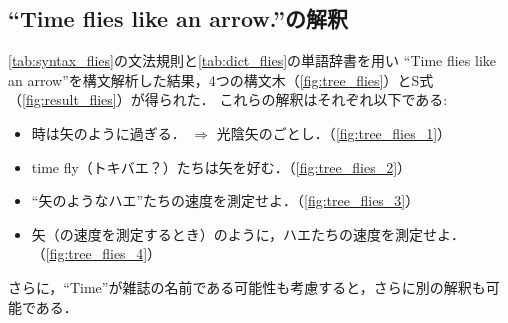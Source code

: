 \documentclass[uplatex, dvipdfmx, a4paper, twocolumn]{jsarticle}
\begin{document}
    \subsection{``Time flies like an arrow.''の解釈}
    \autoref{tab:syntax_flies}の文法規則と\autoref{tab:dict_flies}の単語辞書を用い
    ``Time flies like an arrow''を構文解析した結果，4つの構文木（\autoref{fig:tree_flies}）とS式（\autoref{fig:result_flies}）が得られた．
    これらの解釈はそれぞれ以下である:
    \begin{itemize}
      \item 時は矢のように過ぎる． $\Rightarrow$ 光陰矢のごとし．（\autoref{fig:tree_flies_1}）
      \item time fly（トキバエ？）たちは矢を好む．（\autoref{fig:tree_flies_2}）
      \item ``矢のようなハエ''たちの速度を測定せよ．（\autoref{fig:tree_flies_3}）
      \item 矢（の速度を測定するとき）のように，ハエたちの速度を測定せよ．（\autoref{fig:tree_flies_4}）
    \end{itemize}
    さらに，``Time''が雑誌の名前である可能性も考慮すると，さらに別の解釈も可能である．
\end{document}
